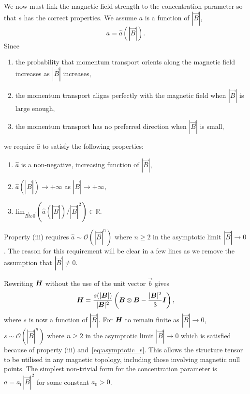 We now must link the magnetic field strength to the concentration parameter so that $s$ has the correct properties. We assume $a$ is a function of $|\vec{B}|$,
\begin{equation}
  a = \hat{a}(|\vec{B}|).
\end{equation}
Since
\begin{enumerate}[label={(\arabic*)}]
  \item the probability that momentum transport orients along the magnetic field increases as $|\vec{B}|$ increases,
  \item the momentum transport aligns perfectly with the magnetic field when $|\vec{B}|$ is large enough,
  \item the momentum transport has no preferred direction when $|\vec{B}|$ is small,
\end{enumerate}
we require $\hat{a}$ to satisfy the following properties:
\begin{enumerate}[label={(\roman*)}]
  \item $\hat{a}$ is a non-negative, increasing function of $|\vec{B}|$,
  \item $\hat{a}(|\vec{B}|) \to + \infty$ as $|\vec{B}| \to + \infty$,
  \item lim$_{\vec{B} to \vec{0}}(\hat{a}(|\vec{B}|)/ |\vec{B}|^2) \in \mathbb{R}$.
\end{enumerate}
Property (iii) requires $\hat{a} \sim \mathcal{O}(|\vec{B}|^n)$ where $n \geq 2$ in the asymptotic limit $|\vec{B}| \to 0$. The reason for this requirement will be clear in a few lines as we remove the assumption that $|\vec{B}| \neq 0$.

Rewriting ${\bm H}$ without the use of the unit vector $\vec{b}$ gives
\begin{equation}
  \label{eq:structure_tensor2}
  {\bm H} = \frac{s(|{\bm B}|)}{|{\bm B}|^2}\left( {\bm B} \otimes {\bm B} - \frac{|{\bm B}|^2}{3}{\bm I} \right),
\end{equation}
where $s$ is now a function of $|\vec{B}|$. For ${\bm H}$ to remain finite as $|\vec{B}| \to 0$, $s \sim \mathcal{O}(|\vec{B}|^n)$ where $n \geq 2$ in the asymptotic limit $|\vec{B}| \to 0$ which is satisfied because of property (iii) and~\ref{eq:asymptotic_s}. This allows the structure tensor to be utilised in any magnetic topology, including those involving magnetic null points. The simplest non-trivial form for the concentration parameter is $a = a_0 |\vec{B}|^2$ for some constant $a_0 > 0$.

